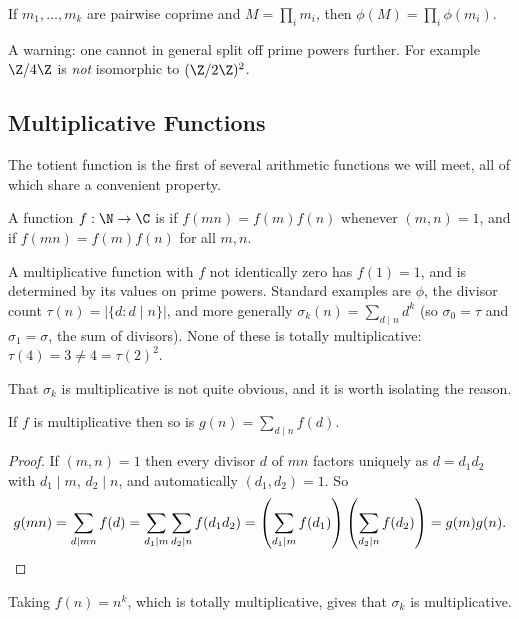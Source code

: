 \begin{corollary}\label{cor:phimult}
	If $m_1, \dots, m_k$ are pairwise coprime and $M = \prod_i m_i$, then $\phi(M) = \prod_i \phi(m_i)$.
\end{corollary}

\begin{remark}
	A warning: one cannot in general split off prime powers further. For example $\Z/4\Z$ is \emph{not} isomorphic to $(\Z/2\Z)^2$.
\end{remark}

\subsection{Multiplicative Functions}

The totient function is the first of several arithmetic functions we will meet, all of which share a convenient property.

\begin{definition}
	A function $f : \N \to \C$ is  if $f(mn) = f(m)f(n)$ whenever $(m, n) = 1$, and  if $f(mn) = f(m)f(n)$ for all $m, n$.
\end{definition}

A multiplicative function with $f$ not identically zero has $f(1) = 1$, and is determined by its values on prime powers. Standard examples are $\phi$, the divisor count $\tau(n) = |\{d : d \mid n\}|$, and more generally $\sigma_k(n) = \sum_{d \mid n} d^k$ (so $\sigma_0 = \tau$ and $\sigma_1 = \sigma$, the sum of divisors). None of these is totally multiplicative: $\tau(4) = 3 \neq 4 = \tau(2)^2$.

That $\sigma_k$ is multiplicative is not quite obvious, and it is worth isolating the reason.

\begin{lemma}\label{lem:divsum}
	If $f$ is multiplicative then so is $g(n) = \sum_{d \mid n} f(d)$.
\end{lemma}
\begin{proof}
	If $(m, n) = 1$ then every divisor $d$ of $mn$ factors uniquely as $d = d_1 d_2$ with $d_1 \mid m$, $d_2 \mid n$, and automatically $(d_1, d_2) = 1$. So
	$$
	g(mn) = \sum_{d \mid mn} f(d) = \sum_{d_1 \mid m} \sum_{d_2 \mid n} f(d_1 d_2) = \left( \sum_{d_1 \mid m} f(d_1) \right) \left( \sum_{d_2 \mid n} f(d_2) \right) = g(m)g(n). \qedhere
	$$
\end{proof}

Taking $f(n) = n^k$, which is totally multiplicative, gives that $\sigma_k$ is multiplicative.

